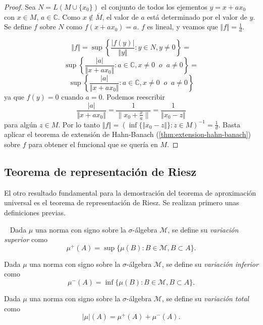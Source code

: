\begin{proof}
Sea $N = L(M \cup \{x_0\})$ el conjunto de todos los ejementos $y = x + ax_0$ con $x \in M$, $a \in \mathbb{C}$. Como $x \notin \overline{M}$, el valor de $a$ está determinado por el valor de $y$. Se define $f$ sobre $N$ como $f(x+ ax_0) = a$. $f$ es lineal, y veamos que $\Vert f \Vert = \frac{1}{d}$.

$$ \Vert f \Vert = \sup \left\{ \frac{\vert f(y) \vert}{\Vert y \Vert} : y \in N, y \neq 0 \right\} = $$
$$ \sup \left\{ \frac{\vert a \vert}{\Vert x + ax_0 \Vert} : a \in \mathbb{C}, x \neq 0 \;\; o \;\; a \neq 0 \right\} =$$ $$ \sup \left\{ \frac{\vert a \vert}{\Vert x + ax_0 \Vert} : a \in \mathbb{C}, x \neq 0 \;\; o \;\; a \neq 0 \right\}$$ ya que $f(y) = 0$ cuando $a = 0$. Podemos reescribir
$$ \frac{\vert a \vert}{\Vert x + ax_0 \Vert} = \frac{1}{\lVert x_0 + \frac{x}{a}\rVert} = \frac{1}{\Vert{x_0} - z \Vert}$$
para algún $z \in M$. Por lo tanto $\Vert f \Vert = ( \inf \{ \Vert x_0 - z\Vert \} : z \in M)^{-1} = \frac{1}{d}$. Basta aplicar el teorema de extensión de Hahn-Banach (\autoref{thm:extension-hahn-banach}) sobre $f$  para obtener el funcional que se quería en $M$.
\end{proof}

\subsection{Teorema de representación de Riesz}

El otro resultado fundamental para la demostración del teorema de aproximación universal es el teorema de representación de Riesz. Se realizan primero unas definiciones previas.

\begin{definicion}
~\cite{ash2014real} Dada $\mu$ una norma con signo sobre la $\sigma$-álgebra $\mathcal{M}$, se define su \textit{variación superior} como $$\mu^+(A) = \sup \{ \mu(B): B \in \mathcal{M}, B \subset A \}. $$
\end{definicion}

\begin{definicion}
Dada $\mu$ una norma con signo sobre la $\sigma$-álgebra $\mathcal{M}$, se define su \textit{variación inferior} como $$\mu^-(A) = \inf \{ \mu(B): B \in \mathcal{M}, B \subset A \}. $$
\end{definicion}

\begin{definicion}
Dada $\mu$ una norma con signo sobre la $\sigma$-álgebra $\mathcal{M}$, se define su \textit{variación total} como $$\vert \mu \vert (A) = \mu^+(A) + \mu^-(A). $$
\end{definicion}

